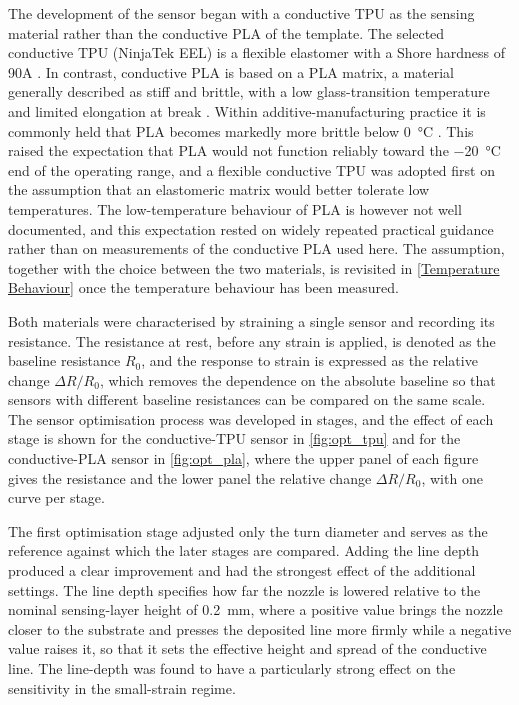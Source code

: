
The development of the sensor began with a conductive TPU as the sensing material rather than the conductive PLA of the template. The selected conductive TPU (NinjaTek EEL) is a flexible elastomer with a Shore hardness of 90A \cite{ninjatek_ninjaflex_2026}. In contrast, conductive PLA is based on a PLA matrix, a material generally described as stiff and brittle, with a low glass-transition temperature and limited elongation at break \cite{Farah2016,protopasta_conductive_pla}. Within additive-manufacturing practice it is commonly held that PLA becomes markedly more brittle below \SI{0}{\celsius} \cite{PLAlowtemp}. This raised the expectation that PLA would not function reliably toward the \SI{-20}{\celsius} end of the operating range, and a flexible conductive TPU was adopted first on the assumption that an elastomeric matrix would better tolerate low temperatures. The low-temperature behaviour of PLA is however not well documented, and this expectation rested on widely repeated practical guidance rather than on measurements of the conductive PLA used here. The assumption, together with the choice between the two materials, is revisited in \cref{Temperature Behaviour} once the temperature behaviour has been measured.

Both materials were characterised by straining a single sensor and recording its resistance. The resistance at rest, before any strain is applied, is denoted as the baseline resistance $R_0$, and the response to strain is expressed as the relative change $\Delta R / R_0$, which removes the dependence on the absolute baseline so that sensors with different baseline resistances can be compared on the same scale. The sensor optimisation process was developed in stages, and the effect of each stage is shown for the conductive-TPU sensor in \cref{fig:opt_tpu} and for the conductive-PLA sensor in \cref{fig:opt_pla}, where the upper panel of each figure gives the resistance and the lower panel the relative change $\Delta R / R_0$, with one curve per stage.
 
The first optimisation stage adjusted only the turn diameter and serves as the reference against which the later stages are compared. Adding the line depth produced a clear improvement and had the strongest effect of the additional settings. The line depth specifies how far the nozzle is lowered relative to the nominal sensing-layer height of \SI{0.2}{\milli\meter}, where a positive value brings the nozzle closer to the substrate and presses the deposited line more firmly while a negative value raises it, so that it sets the effective height and spread of the conductive line. The line-depth was found to have a particularly strong effect on the sensitivity in the small-strain regime.
 
